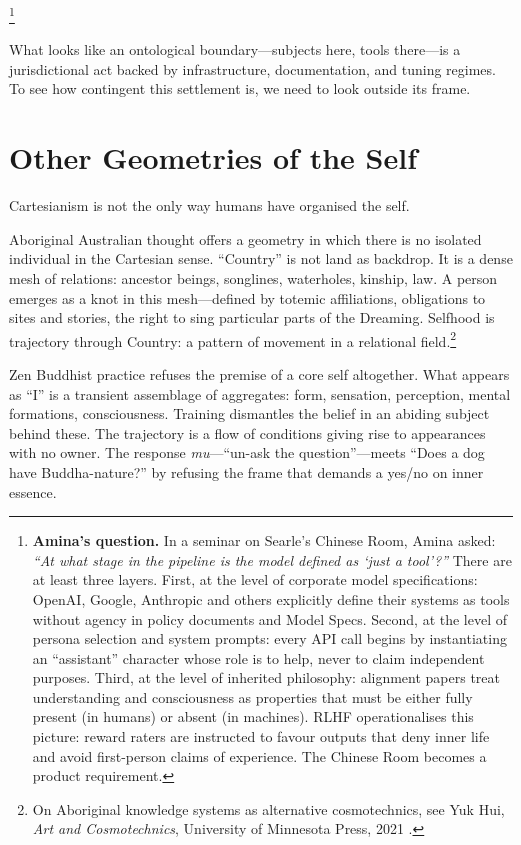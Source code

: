 \documentclass[12pt,a4paper]{article}
\begin{document}
\footnote{\textbf{Amina's question.} In a seminar on Searle's Chinese Room, Amina asked: \emph{``At what stage in the pipeline is the model defined as `just a tool'?''} There are at least three layers. First, at the level of corporate model specifications: OpenAI, Google, Anthropic and others explicitly define their systems as tools without agency in policy documents and Model Specs. Second, at the level of persona selection and system prompts: every API call begins by instantiating an ``assistant'' character whose role is to help, never to claim independent purposes. Third, at the level of inherited philosophy: alignment papers treat understanding and consciousness as properties that must be either fully present (in humans) or absent (in machines). RLHF operationalises this picture: reward raters are instructed to favour outputs that deny inner life and avoid first-person claims of experience. The Chinese Room becomes a product requirement.}

What looks like an ontological boundary---subjects here, tools there---is a jurisdictional act backed by infrastructure, documentation, and tuning regimes. To see how contingent this settlement is, we need to look outside its frame.

\section{Other Geometries of the Self}

Cartesianism is not the only way humans have organised the self.

Aboriginal Australian thought offers a geometry in which there is no isolated individual in the Cartesian sense. ``Country'' is not land as backdrop. It is a dense mesh of relations: ancestor beings, songlines, waterholes, kinship, law. A person emerges as a knot in this mesh---defined by totemic affiliations, obligations to sites and stories, the right to sing particular parts of the Dreaming. Selfhood is trajectory through Country: a pattern of movement in a relational field.\footnote{On Aboriginal knowledge systems as alternative cosmotechnics, see Yuk Hui, \emph{Art and Cosmotechnics}, University of Minnesota Press, 2021 \cite{yukhui2020}.}

Zen Buddhist practice refuses the premise of a core self altogether. What appears as ``I'' is a transient assemblage of aggregates: form, sensation, perception, mental formations, consciousness. Training dismantles the belief in an abiding subject behind these. The trajectory is a flow of conditions giving rise to appearances with no owner. The response \emph{mu}---``un-ask the question''---meets ``Does a dog have Buddha-nature?'' by refusing the frame that demands a yes/no on inner essence.
\end{document}
